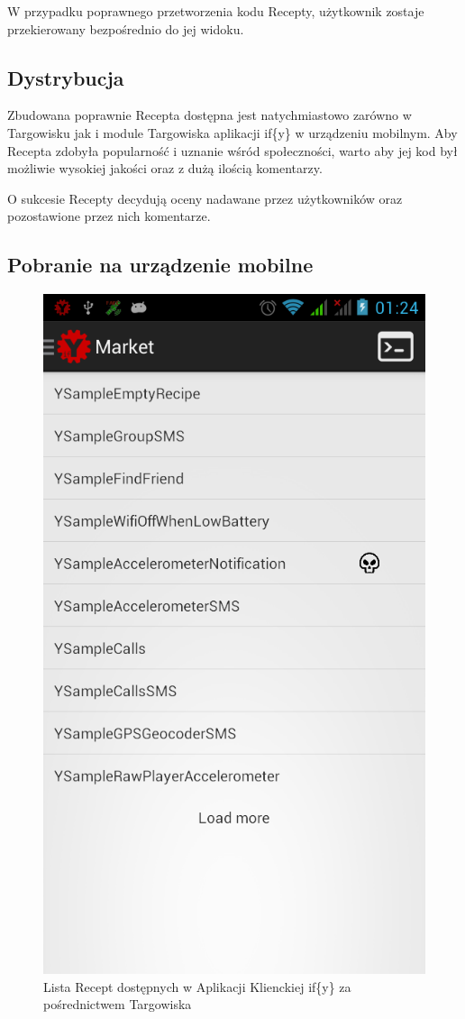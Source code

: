 \documentclass[11pt,a4paper,polish,thesis]{dcsbook}
\begin{document}
W przypadku poprawnego przetworzenia kodu Recepty, użytkownik zostaje przekierowany bezpośrednio do jej widoku.
\subsection{Dystrybucja}
Zbudowana poprawnie Recepta dostępna jest natychmiastowo zarówno w Targowisku jak i module Targowiska aplikacji if\{y\} w urządzeniu mobilnym. Aby Recepta
zdobyła popularność i uznanie wśród społeczności, warto aby jej kod był możliwie wysokiej jakości oraz z dużą ilością komentarzy.

O sukcesie Recepty decydują oceny nadawane przez użytkowników oraz pozostawione przez nich komentarze.
\subsection{Pobranie na urządzenie mobilne}
\begin{figure}[h]
  \centering
  \includegraphics[scale=0.3]{./resources/device_market.png}
  \caption{Lista Recept dostępnych w Aplikacji Klienckiej if\{y\} 
za pośrednictwem Targowiska}
  \label{fig:device_market}
\end{figure}
\end{document}

